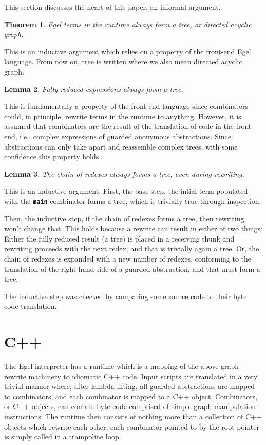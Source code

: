 \documentclass{research4cacm}
\newcommand{\code}[1]{{\bf\texttt{#1}}}
\newtheorem{theorem}{Theorem}[section]
\newtheorem{lemma}[theorem]{Lemma}
\begin{document}
This section discusses the heart of this paper, an informal
argument.

\begin{theorem}
Egel terms in the runtime always form a tree, or directed
acyclic graph.
\end{theorem}

This is an inductive argument which relies on a
property of the front-end Egel language. From now on,
tree is written where we also mean directed acyclic graph.

\begin{lemma}
Fully reduced expressions always form a tree.
\end{lemma}

This is fundamentally a property of the front-end
language since combinators could, in principle, rewrite
terms in the runtime to anything. However, it is assumed
that combinators are the result of the translation of 
code in the front end, i.e., complex expressions of 
guarded anonymous abstractions. Since abstractions can
only take apart and reassemble complex trees, with
some confidence this property holds. 

\begin{lemma}
The chain of redexes always forms a tree, even during rewriting.
\end{lemma}

This is an inductive argument. First, the base step, the intial term
populated with the \code{main} combinator forms a tree, 
which is trivially true through inspection.

Then, the inductive step, if the chain of redexes forms a tree,
then rewriting won't change that. This holds because a rewrite
can result in either of two things: Either the fully
reduced result (a tree) is placed in a receiving thunk and
rewriting proceeds with the next redex, and that is trivially
again a tree. Or, the chain of redexes is expanded with a new number 
of redexes, conforming to the translation of the right-hand-side of
a guarded abstraction, and that must form a tree.

The inductive step was checked by comparing some source code to
their byte code translation.

\section{C++}

The Egel interpreter has a runtime which is a mapping of the above
graph rewrite machinery to idiomatic C++ code. Input
scripts are translated in a very trivial manner where,
after lambda-lifting, all guarded abstractions are mapped
to combinators, and each combinator is mapped to a C++
object. Combinators, or C++ objects, can contain byte
code comprised of simple graph manipulation instructions.
The runtime then consists of nothing more than a
collection of C++ objects which rewrite each other;
each combinator pointed to by the root pointer is 
simply called in a trampoline loop.
\end{document}
